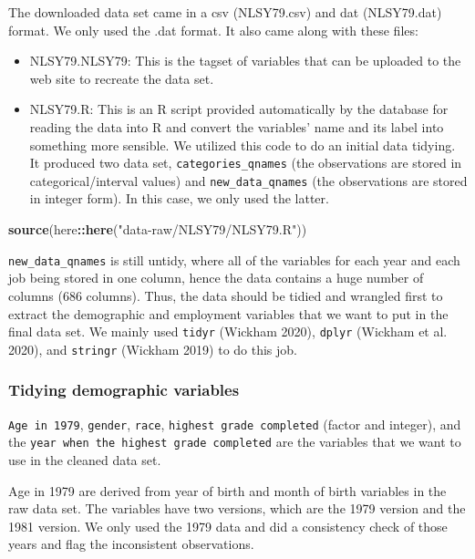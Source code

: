 \documentclass{article}
\newenvironment{Shaded}{\begin{snugshade}}{\end{snugshade}}
\newcommand{\KeywordTok}[1]{\textcolor[rgb]{0.13,0.29,0.53}{\textbf{#1}}}
\newcommand{\NormalTok}[1]{#1}
\newcommand{\OperatorTok}[1]{\textcolor[rgb]{0.81,0.36,0.00}{\textbf{#1}}}
\newcommand{\StringTok}[1]{\textcolor[rgb]{0.31,0.60,0.02}{#1}}
\begin{document}
The downloaded data set came in a csv (NLSY79.csv) and dat (NLSY79.dat)
format. We only used the .dat format. It also came along with these
files:

\begin{itemize}
\tightlist
\item
  NLSY79.NLSY79: This is the tagset of variables that can be uploaded to
  the web site to recreate the data set.
\item
  NLSY79.R: This is an R script provided automatically by the database
  for reading the data into R and convert the variables' name and its
  label into something more sensible. We utilized this code to do an
  initial data tidying. It produced two data set,
  \texttt{categories\_qnames} (the observations are stored in
  categorical/interval values) and \texttt{new\_data\_qnames} (the
  observations are stored in integer form). In this case, we only used
  the latter.
\end{itemize}

\begin{Shaded}
\begin{Highlighting}[]
\KeywordTok{source}\NormalTok{(here}\OperatorTok{::}\KeywordTok{here}\NormalTok{(}\StringTok{"data-raw/NLSY79/NLSY79.R"}\NormalTok{))}
\end{Highlighting}
\end{Shaded}

\texttt{new\_data\_qnames} is still untidy, where all of the variables
for each year and each job being stored in one column, hence the data
contains a huge number of columns (686 columns). Thus, the data should
be tidied and wrangled first to extract the demographic and employment
variables that we want to put in the final data set. We mainly used
\texttt{tidyr} (Wickham 2020), \texttt{dplyr} (Wickham et al. 2020), and
\texttt{stringr} (Wickham 2019) to do this job.

\hypertarget{tidying-demographic-variables}{%
\subsubsection{Tidying demographic
variables}\label{tidying-demographic-variables}}

\texttt{Age\ in\ 1979}, \texttt{gender}, \texttt{race},
\texttt{highest\ grade\ completed} (factor and integer), and the
\texttt{year\ when\ the\ highest\ grade\ completed} are the variables
that we want to use in the cleaned data set.

Age in 1979 are derived from year of birth and month of birth variables
in the raw data set. The variables have two versions, which are the 1979
version and the 1981 version. We only used the 1979 data and did a
consistency check of those years and flag the inconsistent observations.
\end{document}
